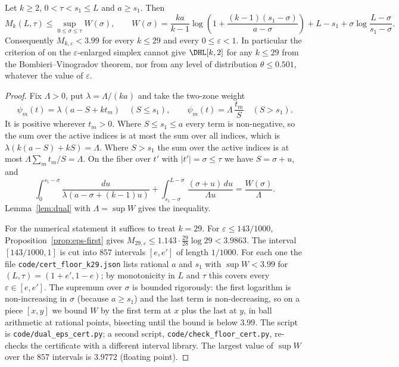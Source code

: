 \begin{theorem}\label{thm:floor}
Let $k\ge2$, $0<\tau<s_1\le L$ and $a\ge s_1$. Then
\[
M_k(L,\tau)\le\sup_{0\le\sigma\le\tau}W(\sigma),\qquad
W(\sigma)=\frac{ka}{k-1}\log\left(1+\frac{(k-1)(s_1-\sigma)}{a-\sigma}\right)+L-s_1+\sigma\log\frac{L-\sigma}{s_1-\sigma}.
\]
Consequently $M_{k,\varepsilon}<3.99$ for every $k\le29$ and every
$0\le\varepsilon<1$. In particular the criterion of \cite[Thm.~3.12]{Pol14b}
on the $\varepsilon$-enlarged simplex cannot give $\DHL[k,2]$ for any
$k\le29$ from the Bombieri--Vinogradov theorem, nor from any level of
distribution $\theta\le0.501$, whatever the value of $\varepsilon$.
\end{theorem}

\begin{proof}
Fix $\Lambda>0$, put $\lambda=\Lambda/(ka)$ and take the two-zone weight
\[
\psi_m(t)=\lambda\,(a-S+kt_m)\quad(S\le s_1),\qquad
\psi_m(t)=\Lambda\,\frac{t_m}{S}\quad(S>s_1).
\]
It is positive wherever $t_m>0$. Where $S\le s_1\le a$ every term is
non-negative, so the sum over the active indices is at most the sum over all
indices, which is $\lambda(k(a-S)+kS)=\Lambda$. Where $S>s_1$ the sum over the
active indices is at most $\Lambda\sum_mt_m/S=\Lambda$. On the fiber over $t'$
with $|t'|=\sigma\le\tau$ we have $S=\sigma+u$, and
\[
\int_0^{s_1-\sigma}\frac{du}{\lambda(a-\sigma+(k-1)u)}+\int_{s_1-\sigma}^{L-\sigma}\frac{(\sigma+u)\,du}{\Lambda u}=\frac{W(\sigma)}{\Lambda}.
\]
Lemma~\ref{lem:dual} with $\Lambda=\sup W$ gives the inequality.

For the numerical statement it suffices to treat $k=29$. For
$\varepsilon\le143/1000$, Proposition~\ref{prop:eps-first} gives
$M_{29,\varepsilon}\le1.143\cdot\frac{29}{28}\log29<3.9863$. The interval
$[143/1000,1]$ is cut into $857$ intervals $[e,e']$ of length $1/1000$. For
each one the file \texttt{code/cert\_floor\_k29.json} lists rational $a$ and
$s_1$ with $\sup W<3.99$ for $(L,\tau)=(1+e',1-e)$; by monotonicity in $L$ and
$\tau$ this covers every $\varepsilon\in[e,e']$. The supremum over $\sigma$ is
bounded rigorously: the first logarithm is non-increasing in $\sigma$ (because
$a\ge s_1$) and the last term is non-decreasing, so on a piece $[x,y]$ we bound
$W$ by the first term at $x$ plus the last at $y$, in ball arithmetic at
rational points, bisecting until the bound is below $3.99$. The script is
\texttt{code/dual\_eps\_cert.py}; a second script,
\texttt{code/check\_floor\_cert.py}, re-checks the certificate with a
different interval library. The largest value of $\sup W$ over the $857$
intervals is $3.9772$ (floating point).
\end{proof}


